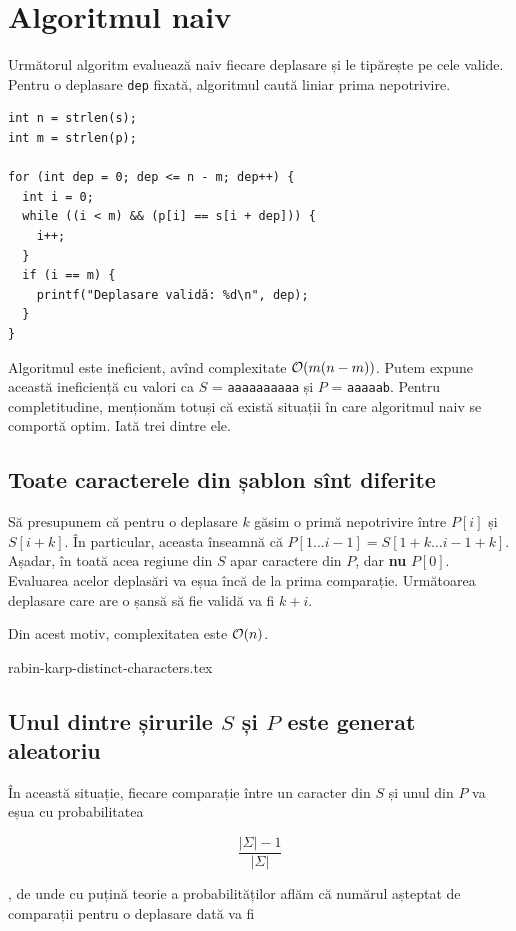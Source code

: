 \documentclass[../main.tex]{subfiles}
\begin{document}
\section{Algoritmul naiv}

Următorul algoritm evaluează naiv fiecare deplasare și le tipărește pe cele valide. Pentru o deplasare \texttt{dep} fixată, algoritmul caută liniar prima nepotrivire.

\begin{verbatim}
int n = strlen(s);
int m = strlen(p);

for (int dep = 0; dep <= n - m; dep++) {
  int i = 0;
  while ((i < m) && (p[i] == s[i + dep])) {
    i++;
  }
  if (i == m) {
    printf("Deplasare validă: %d\n", dep);
  }
}
\end{verbatim}

Algoritmul este ineficient, avînd complexitate $\mathcal{O}(m(n-m))$. Putem expune această ineficiență cu valori ca $S$ = \texttt{aaaaaaaaaa} și $P$ = \texttt{aaaaab}. Pentru completitudine, menționăm totuși că există situații în care algoritmul naiv se comportă optim. Iată trei dintre ele.


\subsection{Toate caracterele din șablon sînt diferite}

Să presupunem că pentru o deplasare $k$ găsim o primă nepotrivire între $P[i]$ și $S[i + k]$. În particular, aceasta înseamnă că $P[1 \dots i-1] = S[1 + k \dots i - 1 + k]$. Așadar, în toată acea regiune din $S$ apar caractere din $P$, dar \textbf{nu} $P[0]$. Evaluarea acelor deplasări va eșua încă de la prima comparație. Următoarea deplasare care are o șansă să fie validă va fi $k + i$.

Din acest motiv, complexitatea este $\mathcal{O}(n)$.

{rabin-karp-distinct-characters.tex}

\subsection{Unul dintre șirurile \texorpdfstring{$S$}{S} și \texorpdfstring{$P$}{P} este generat aleatoriu}

În această situație, fiecare comparație între un caracter din $S$ și unul din $P$ va eșua cu probabilitatea

$$\frac{|\Sigma| - 1}{|\Sigma|}$$

, de unde cu puțină teorie a probabilităților aflăm că numărul așteptat de comparații pentru o deplasare dată va fi
\end{document}

